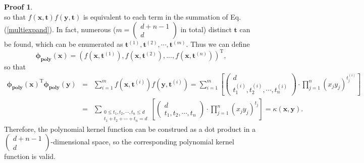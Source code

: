 \documentclass[a4paper,UTF8]{article}
\numberwithin{equation}{section}
\theoremstyle{definition}
\newtheorem*{prove}{Proof}
\begin{document}
\begin{prove}
\begin{equation}
\end{equation}
so that $f(\bm{x},\bm{t})f(\bm{y},\bm{t})$ is equivalent to each term in the summation of Eq.(\ref{multiexpand}). In fact, numerous ($m=\begin{pmatrix}d+n-1\\d\end{pmatrix}$ in total) distinct $\bm{t}$ can be found, which can be enumerated as $\bm{t}^{(1)}, \bm{t}^{(2)}, \cdots, \bm{t}^{(m)}$. Thus we can define
\begin{equation}
\bm{\phi}_{\textbf{poly}}(\bm{x})=\left(f(\bm{x},\bm{t}^{(1)}), f(\bm{x},\bm{t}^{(2)}), ..., f(\bm{x},\bm{t}^{(n)})\right)^\mathrm{T},
\end{equation}
so that
\begin{eqnarray}
\bm{\phi}_{\textbf{poly}}(\bm{x})^\mathrm{T}\bm{\phi}_{\textbf{poly}}(\bm{y})&=&\sum_{i=1}^mf(\bm{x},\bm{t}^{(i)})f(\bm{y},\bm{t}^{(i)})=\sum_{i=1}^m\left[\begin{pmatrix}d\\t_1^{(i)},t_2^{(i)},\cdots,t_n^{(i)}\end{pmatrix}\cdot\prod_{j=1}^n(x_jy_j)^{t_j^{(i)}}\right]\nonumber\\
&=&\sum_{\substack{0\leq t_1,t_2,\cdots,t_n\leq d \\ t_1+t_2+\cdots+t_n=d}}\left[\begin{pmatrix}d\\t_1,t_2,\cdots,t_n\end{pmatrix}\cdot\prod_{j=1}^n(x_jy_j)^{t_j}\right]=\kappa(\bm{x},\bm{y}).
\end{eqnarray}
Therefore, the polynomial kernel function can be construed as a dot product in a $\begin{pmatrix}d+n-1\\d\end{pmatrix}$-dimensional space, so the corresponding polynomial kernel function is valid.


\end{prove}
\end{document}
